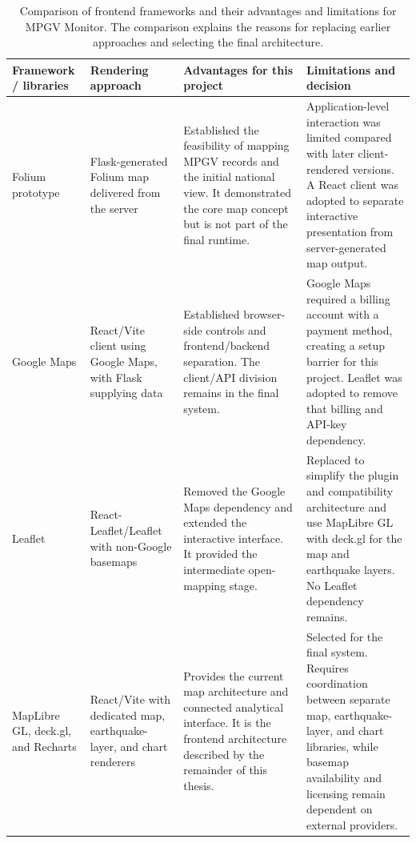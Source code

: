 \documentclass[12pt]{article}
\begin{document}
\begin{table}[H]
\centering
\caption[Comparison of frontend frameworks and their advantages and limitations.]{Comparison of frontend frameworks and their advantages and limitations for MPGV Monitor. The comparison explains the reasons for replacing earlier approaches and selecting the final architecture.}
\label{tab:frontend-technology-decisions}
\footnotesize
\setlength{\tabcolsep}{2pt}
\renewcommand{\arraystretch}{1.02}
\begin{tabular}{
    >{\raggedright\arraybackslash}p{1.9cm}
    >{\raggedright\arraybackslash}p{3.1cm}
    >{\raggedright\arraybackslash}p{4.8cm}
    >{\raggedright\arraybackslash}p{5.0cm}}
\toprule
\textbf{Framework / libraries} & \textbf{Rendering approach} & \textbf{Advantages for this project} & \textbf{Limitations and decision} \\
\midrule
Folium prototype & Flask-generated Folium map delivered from the server & Established the feasibility of mapping MPGV records and the initial national view. It demonstrated the core map concept but is not part of the final runtime. & Application-level interaction was limited compared with later client-rendered versions. A React client was adopted to separate interactive presentation from server-generated map output. \\
Google Maps & React/Vite client using Google Maps, with Flask supplying data & Established browser-side controls and frontend/backend separation. The client/API division remains in the final system. & Google Maps required a billing account with a payment method, creating a setup barrier for this project. Leaflet was adopted to remove that billing and API-key dependency. \\
Leaflet & React-Leaflet/Leaflet with non-Google basemaps & Removed the Google Maps dependency and extended the interactive interface. It provided the intermediate open-mapping stage. & Replaced to simplify the plugin and compatibility architecture and use MapLibre GL with deck.gl for the map and earthquake layers. No Leaflet dependency remains. \\
MapLibre GL, deck.gl, and Recharts & React/Vite with dedicated map, earthquake-layer, and chart renderers & Provides the current map architecture and connected analytical interface. It is the frontend architecture described by the remainder of this thesis. & Selected for the final system. Requires coordination between separate map, earthquake-layer, and chart libraries, while basemap availability and licensing remain dependent on external providers. \\
\bottomrule
\end{tabular}
\end{table}
\end{document}
